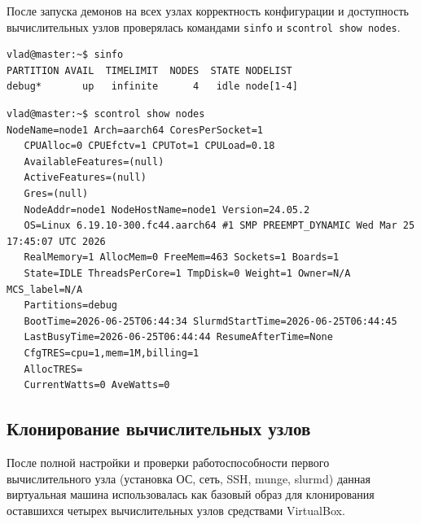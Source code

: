 После запуска демонов на всех узлах корректность конфигурации и
доступность вычислительных узлов проверялась командами
\texttt{sinfo} и \texttt{scontrol show nodes}.

\begin{lstlisting}[caption={Вывод команды \texttt{sinfo}}]
vlad@master:~$ sinfo
PARTITION AVAIL  TIMELIMIT  NODES  STATE NODELIST
debug*       up   infinite      4   idle node[1-4]
\end{lstlisting}

\begin{lstlisting}[caption={Фрагмент вывода команды \texttt{scontrol show nodes}}]
vlad@master:~$ scontrol show nodes
NodeName=node1 Arch=aarch64 CoresPerSocket=1 
   CPUAlloc=0 CPUEfctv=1 CPUTot=1 CPULoad=0.18
   AvailableFeatures=(null)
   ActiveFeatures=(null)
   Gres=(null)
   NodeAddr=node1 NodeHostName=node1 Version=24.05.2
   OS=Linux 6.19.10-300.fc44.aarch64 #1 SMP PREEMPT_DYNAMIC Wed Mar 25 17:45:07 UTC 2026 
   RealMemory=1 AllocMem=0 FreeMem=463 Sockets=1 Boards=1
   State=IDLE ThreadsPerCore=1 TmpDisk=0 Weight=1 Owner=N/A MCS_label=N/A
   Partitions=debug 
   BootTime=2026-06-25T06:44:34 SlurmdStartTime=2026-06-25T06:44:45
   LastBusyTime=2026-06-25T06:44:44 ResumeAfterTime=None
   CfgTRES=cpu=1,mem=1M,billing=1
   AllocTRES=
   CurrentWatts=0 AveWatts=0
\end{lstlisting}

\subsection*{Клонирование вычислительных узлов}

После полной настройки и проверки работоспособности первого
вычислительного узла (установка ОС, сеть, SSH, munge, slurmd) данная
виртуальная машина использовалась как базовый образ для клонирования
оставшихся четырех вычислительных узлов средствами VirtualBox.